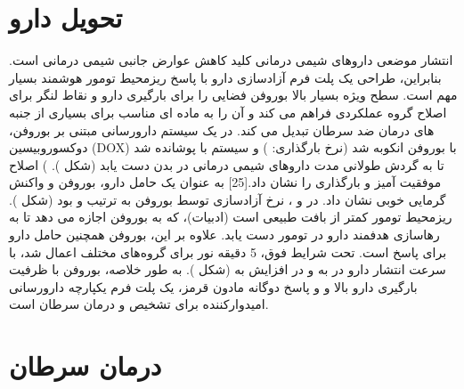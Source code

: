 \section{تحویل دارو }
انتشار موضعی داروهای شیمی درمانی کلید کاهش عوارض جانبی شیمی درمانی است. بنابراین، طراحی یک پلت فرم آزادسازی دارو با پاسخ ریزمحیط تومور هوشمند بسیار مهم است. سطح ویژه بسیار بالا بوروفن فضایی را برای بارگیری دارو و نقاط لنگر برای اصلاح گروه عملکردی فراهم می کند و آن را به ماده ای مناسب برای بسیاری از جنبه های درمان ضد سرطان تبدیل می کند. در یک سیستم دارورسانی مبتنی بر بوروفن، دوکسوروبیسین (DOX) با بوروفن انکوبه شد (نرخ بارگذاری: ) و سیستم با  پوشانده شد تا به گردش طولانی مدت داروهای شیمی درمانی در بدن دست یابد (شکل ). ) اصلاح موفقیت آمیز  و بارگذاری  را نشان داد.\cite{jiNovelTopDownSynthesis2018}[25] به عنوان یک حامل دارو، بوروفن  و واکنش گرمایی خوبی نشان داد. در  و ، نرخ آزادسازی  توسط بوروفن به ترتیب  و  بود (شکل ).  ریزمحیط تومور کمتر از بافت طبیعی است (ادبیات)، که به بوروفن اجازه می دهد تا به رهاسازی هدفمند دارو در تومور دست یابد. علاوه بر این، بوروفن همچنین حامل دارو برای پاسخ  است. تحت شرایط فوق، 5 دقیقه نور  برای گروه‌های  مختلف اعمال شد، با سرعت انتشار دارو در  به  و در  افزایش به  (شکل ). به طور خلاصه، بوروفن با ظرفیت بارگیری دارو بالا و  و پاسخ دوگانه مادون قرمز، یک پلت فرم یکپارچه دارورسانی امیدوارکننده برای تشخیص و درمان سرطان است.\section{درمان سرطان}
